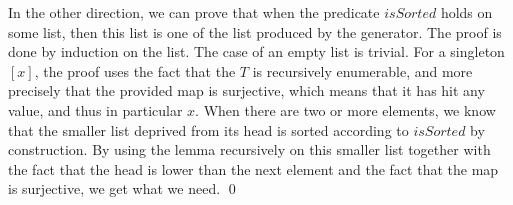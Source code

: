 In the other direction, we can prove that when the predicate $isSorted$ holds on some list, then this list is one of the list produced by the generator. The proof is done by induction on the list. The case of an empty list is trivial. For a singleton $[x]$, the proof uses the fact that the $T$ is recursively enumerable, and more precisely that the provided map is surjective, which means that it has hit any value, and thus in particular $x$. When there are two or more elements, we know that the smaller list deprived from its head is sorted according to $isSorted$ by construction. By using the lemma recursively on this smaller list together with the fact that the head is lower than the next element and the fact that the map is surjective, we get what we need. \qed
